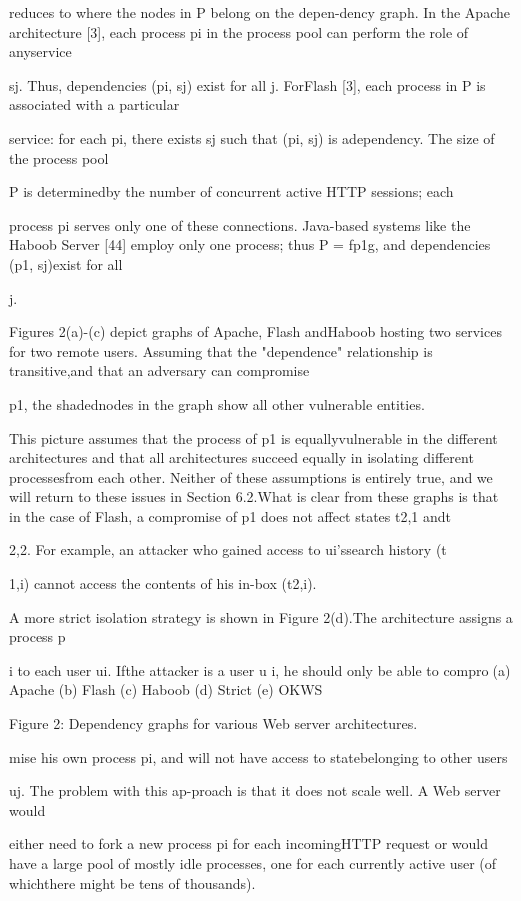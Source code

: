 reduces to where the nodes in P belong on the depen-dency graph. In the Apache architecture [3], each process pi in the process pool can perform the role of anyservice

sj. Thus, dependencies (pi, sj) exist for all j. ForFlash [3], each process in P is associated with a particular

service: for each pi, there exists sj such that (pi, sj) is adependency. The size of the process pool

P is determinedby the number of concurrent active HTTP sessions; each

process pi serves only one of these connections. Java-based systems like the Haboob Server [44] employ only
one process; thus P = fp1g, and dependencies (p1, sj)exist for all

j.

Figures 2(a)-(c) depict graphs of Apache, Flash andHaboob hosting two services for two remote users. Assuming that the "dependence" relationship is transitive,and that an adversary can compromise

p1, the shadednodes in the graph show all other vulnerable entities.

This picture assumes that the process of p1 is equallyvulnerable in the different architectures and that all architectures succeed equally in isolating different processesfrom each other. Neither of these assumptions is entirely
true, and we will return to these issues in Section 6.2.What is clear from these graphs is that in the case of
Flash, a compromise of p1 does not affect states t2,1 andt

2,2. For example, an attacker who gained access to ui'ssearch history (t

1,i) cannot access the contents of his in-box
(t2,i).

A more strict isolation strategy is shown in Figure 2(d).The architecture assigns a process p

i to each user ui. Ifthe attacker is a user u
i, he should only be able to compro(a) Apache (b) Flash (c) Haboob (d) Strict (e) OKWS

Figure 2: Dependency graphs for various Web server architectures.

mise his own process pi, and will not have access to statebelonging to other users

uj. The problem with this ap-proach is that it does not scale well. A Web server would

either need to fork a new process pi for each incomingHTTP request or would have a large pool of mostly idle
processes, one for each currently active user (of whichthere might be tens of thousands).

